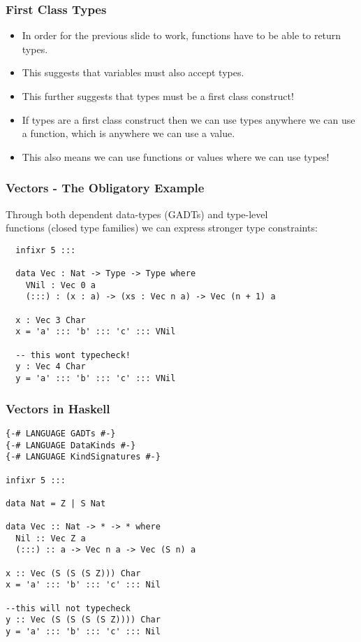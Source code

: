 \documentclass{beamer}
\begin{document}
\begin{frame}[fragile]
\frametitle{First Class Types}
\begin{itemize}
\item In order for the previous slide to work, functions have to be able to
return types.
\item This suggests that variables must also accept types.
\item This further suggests that types must be a first class construct!
\item If types are a first class construct then we can use types anywhere we
can use a function, which is anywhere we can use a value.
\item This also means we can use functions or values where we can use types!
\end{itemize}
\end{frame}

\begin{frame}[fragile]
\frametitle{Vectors - The Obligatory Example}
\begin{minipage}{1\textwidth}
Through both dependent data-types (GADTs) and type-level \\
functions (closed type families) we can express stronger type constraints: \\ 
  \begin{verbatim}
  infixr 5 ::: 

  data Vec : Nat -> Type -> Type where
    VNil : Vec 0 a 
    (:::) : (x : a) -> (xs : Vec n a) -> Vec (n + 1) a

  x : Vec 3 Char
  x = 'a' ::: 'b' ::: 'c' ::: VNil

  -- this wont typecheck!
  y : Vec 4 Char
  y = 'a' ::: 'b' ::: 'c' ::: VNil
  \end{verbatim}
\end{minipage}
\end{frame}

\begin{frame}[fragile, shrink=5]
\frametitle{Vectors in Haskell}
\begin{verbatim}
{-# LANGUAGE GADTs #-}
{-# LANGUAGE DataKinds #-}
{-# LANGUAGE KindSignatures #-}

infixr 5 ::: 

data Nat = Z | S Nat 

data Vec :: Nat -> * -> * where
  Nil :: Vec Z a 
  (:::) :: a -> Vec n a -> Vec (S n) a

x :: Vec (S (S (S Z))) Char
x = 'a' ::: 'b' ::: 'c' ::: Nil 

--this will not typecheck
y :: Vec (S (S (S (S Z)))) Char
y = 'a' ::: 'b' ::: 'c' ::: Nil 
\end{verbatim}
\end{frame}
\end{document}
